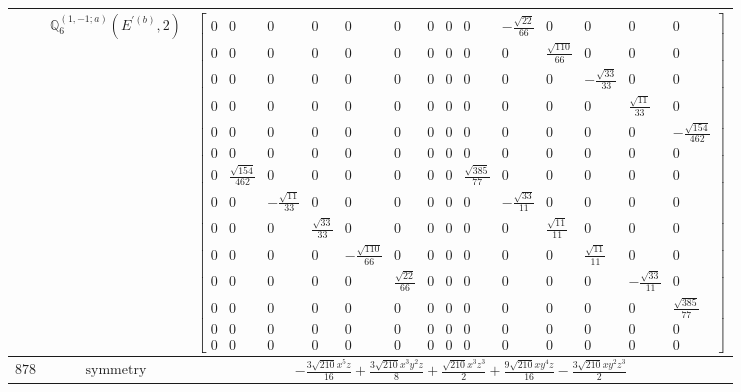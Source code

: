 \documentclass[fleqn,8pt,landscape]{jsarticle}
\begin{document}
\begin{longtable}{ccc}
$  $ & $ \mathbb{Q}_{6}^{(1,-1;a)}(E^{\prime(b)},2) $ & $ \begin{bmatrix} 0 & 0 & 0 & 0 & 0 & 0 & 0 & 0 & 0 & - \frac{\sqrt{22}}{66} & 0 & 0 & 0 & 0 \\ 0 & 0 & 0 & 0 & 0 & 0 & 0 & 0 & 0 & 0 & \frac{\sqrt{110}}{66} & 0 & 0 & 0 \\ 0 & 0 & 0 & 0 & 0 & 0 & 0 & 0 & 0 & 0 & 0 & - \frac{\sqrt{33}}{33} & 0 & 0 \\ 0 & 0 & 0 & 0 & 0 & 0 & 0 & 0 & 0 & 0 & 0 & 0 & \frac{\sqrt{11}}{33} & 0 \\ 0 & 0 & 0 & 0 & 0 & 0 & 0 & 0 & 0 & 0 & 0 & 0 & 0 & - \frac{\sqrt{154}}{462} \\ 0 & 0 & 0 & 0 & 0 & 0 & 0 & 0 & 0 & 0 & 0 & 0 & 0 & 0 \\ 0 & \frac{\sqrt{154}}{462} & 0 & 0 & 0 & 0 & 0 & 0 & \frac{\sqrt{385}}{77} & 0 & 0 & 0 & 0 & 0 \\ 0 & 0 & - \frac{\sqrt{11}}{33} & 0 & 0 & 0 & 0 & 0 & 0 & - \frac{\sqrt{33}}{11} & 0 & 0 & 0 & 0 \\ 0 & 0 & 0 & \frac{\sqrt{33}}{33} & 0 & 0 & 0 & 0 & 0 & 0 & \frac{\sqrt{11}}{11} & 0 & 0 & 0 \\ 0 & 0 & 0 & 0 & - \frac{\sqrt{110}}{66} & 0 & 0 & 0 & 0 & 0 & 0 & \frac{\sqrt{11}}{11} & 0 & 0 \\ 0 & 0 & 0 & 0 & 0 & \frac{\sqrt{22}}{66} & 0 & 0 & 0 & 0 & 0 & 0 & - \frac{\sqrt{33}}{11} & 0 \\ 0 & 0 & 0 & 0 & 0 & 0 & 0 & 0 & 0 & 0 & 0 & 0 & 0 & \frac{\sqrt{385}}{77} \\ 0 & 0 & 0 & 0 & 0 & 0 & 0 & 0 & 0 & 0 & 0 & 0 & 0 & 0 \\ 0 & 0 & 0 & 0 & 0 & 0 & 0 & 0 & 0 & 0 & 0 & 0 & 0 & 0 \end{bmatrix} $ \\ \hline
$ 878 $ & $ \text{symmetry} $ & $ - \frac{3 \sqrt{210} x^{5} z}{16} + \frac{3 \sqrt{210} x^{3} y^{2} z}{8} + \frac{\sqrt{210} x^{3} z^{3}}{2} + \frac{9 \sqrt{210} x y^{4} z}{16} - \frac{3 \sqrt{210} x y^{2} z^{3}}{2} $ \\

\end{longtable}
\end{document}

